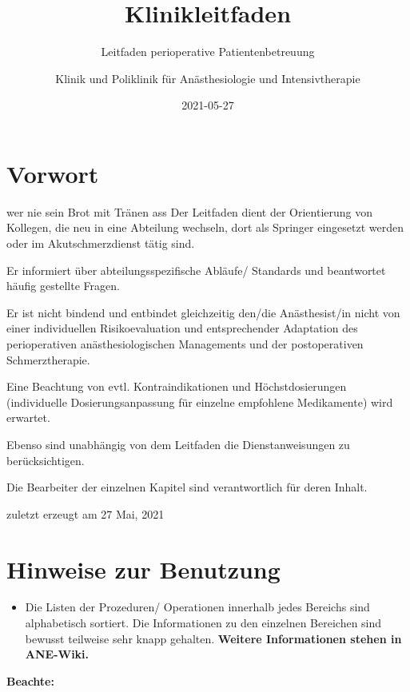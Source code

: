 \documentclass[
]{book}
\title{Klinikleitfaden}
\subtitle{Leitfaden perioperative Patientenbetreuung}
\author{Klinik und Poliklinik für Anästhesiologie und Intensivtherapie}
\date{2021-05-27}
\providecommand{\tightlist}{%
  \setlength{\itemsep}{0pt}\setlength{\parskip}{0pt}}
\begin{document}
\maketitle

{
\setcounter{tocdepth}{1}
\tableofcontents
}
\hypertarget{vorwort}{%
\chapter*{Vorwort}\label{vorwort}}

wer nie sein Brot mit Tränen ass
Der Leitfaden dient der Orientierung von Kollegen, die neu in eine Abteilung wechseln, dort als Springer eingesetzt werden oder im Akutschmerzdienst tätig sind.

Er informiert über abteilungsspezifische Abläufe/ Standards und beantwortet häufig gestellte Fragen.

Er ist nicht bindend und entbindet gleichzeitig den/die Anästhesist/in nicht von einer individuellen Risikoevaluation und entsprechender Adaptation des perioperativen anästhesiologischen Managements und der postoperativen Schmerztherapie.

Eine Beachtung von evtl. Kontraindikationen und Höchstdosierungen (individuelle Dosierungsanpassung für einzelne empfohlene Medikamente) wird erwartet.

Ebenso sind unabhängig von dem Leitfaden die Dienstanweisungen zu berücksichtigen.

Die Bearbeiter der einzelnen Kapitel sind verantwortlich für deren Inhalt.

zuletzt erzeugt am 27 Mai, 2021

\hypertarget{hinweise-zur-benutzung}{%
\chapter*{Hinweise zur Benutzung}\label{hinweise-zur-benutzung}}

\begin{itemize}
\tightlist
\item
  Die Listen der Prozeduren/ Operationen innerhalb jedes Bereichs sind alphabetisch sortiert. Die Informationen zu den einzelnen Bereichen sind bewusst teilweise sehr knapp gehalten. \textbf{Weitere Informationen stehen in ANE-Wiki.}
\end{itemize}

\textbf{Beachte:}
\end{document}
